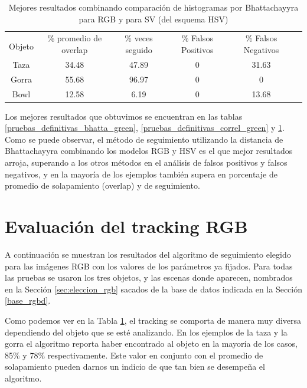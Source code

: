 \begin{table}[h]
	\centering
	\begin{tabular}{|c|c|c|c|c|c|}
	    \hline
	    & \multirow{2}{2.4cm}{\% promedio de overlap} & \multirow{2}{2cm}{\% veces seguido} & \multirow{2}{1.6cm}{\% Falsos Positivos} & \multirow{2}{1.6cm}{\% Falsos Negativos}\\
		Objeto & & & &\\
	    \hline
	    Taza   & 34.48      & 47.89     & 0        & 31.63  \\
	    \hline
	    Gorra  & 55.68      & 96.97     & 0        & 0      \\
	    \hline
	    Bowl   & 12.58      &  6.19     & 0        & 13.68  \\
	    \hline
    \end{tabular}
	\caption{Mejores resultados combinando comparación de histogramas por Bhattachayyra para RGB y para SV (del esquema HSV)}
	\label{tab:tabla_rgb}
\end{table}

Los mejores resultados que obtuvimos se encuentran en las tablas \ref{pruebas_definitivas_bhatta_green}, \ref{pruebas_definitivas_correl_green} y \ref{tab:tabla_rgb}. Como se puede observar, el método de seguimiento utilizando la distancia de Bhattachayyra combinando los modelos RGB y HSV es el que mejor resultados arroja, superando a los otros métodos en el análisis de falsos positivos y falsos negativos, y en la mayoría de los ejemplos también supera en porcentaje de promedio de solapamiento (overlap) y de seguimiento.


\section{Evaluación del tracking RGB}\label{eval_rgb}
A continuación se muestran los resultados del algoritmo de seguimiento elegido para las imágenes RGB con los valores de los parámetros ya fijados. Para todas las pruebas se usaron los tres objetos, y las escenas donde aparecen, nombrados en la Sección \ref{sec:eleccion_rgb} sacados de la base de datos indicada en la Sección \ref{base_rgbd}.

Como podemos ver en la Tabla \ref{tab:tabla_rgb}, el tracking se comporta de manera muy diversa dependiendo del objeto que se esté analizando. En los ejemplos de la taza y la gorra el algoritmo reporta haber encontrado al objeto en la mayoría de los casos, 85\% y 78\% respectivamente. Este valor en conjunto con el promedio de solapamiento pueden darnos un indicio de que tan bien se desempeña el algoritmo.

